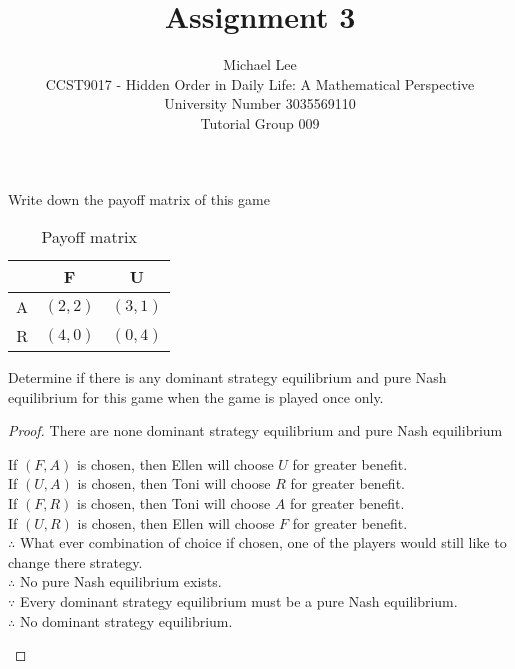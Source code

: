 \documentclass[12pt]{article}
\newenvironment{question}[2][Question]{\begin{trivlist}
\item[\hskip \labelsep {\bfseries #1}\hskip \labelsep {\bfseries #2.}]}{\end{trivlist}}
\begin{document}


\title{Assignment 3}%
\author{Michael Lee\\ %
	CCST9017 - Hidden Order in Daily Life: A Mathematical Perspective \\
	University Number 3035569110 \\
	Tutorial Group 009
} %


\maketitle

\begin{question}{1a}
	Write down the payoff matrix of this game
\end{question}
\begin{table}[h!]
	\begin{center}
		\caption{Payoff matrix}
		\label{tab:table1}
		\begin{tabular}{r|c|c} %

			  & F       & U       \\
			\hline
			A & $(2,2)$ & $(3,1)$ \\
			R & $(4,0)$ & $(0,4)$ \\
		\end{tabular}
	\end{center}
\end{table}

\begin{question}{1b}
	Determine if there is any dominant strategy equilibrium and pure Nash equilibrium for this game when the game is played once only.
\end{question}
\begin{proof}
	There are none dominant strategy equilibrium and pure Nash equilibrium
	\begin{flushleft}
		If $(F,A)$ is chosen, then Ellen will choose $U$ for greater benefit. \\
		If $(U,A)$ is chosen, then Toni will choose $R$ for greater benefit. \\
		If $(F,R)$ is chosen, then Toni will choose $A$ for greater benefit. \\
		If $(U,R)$ is chosen, then Ellen will choose $F$ for greater benefit. \\
		$\therefore$ What ever combination of choice if chosen, one of the players would still like to change there strategy. \\
		$\therefore$ No pure Nash equilibrium exists.\\
		$\because$ Every dominant strategy equilibrium must be a pure Nash equilibrium.\\
		$\therefore$ No dominant strategy equilibrium. \\
	\end{flushleft}
\end{proof}
\end{document}
